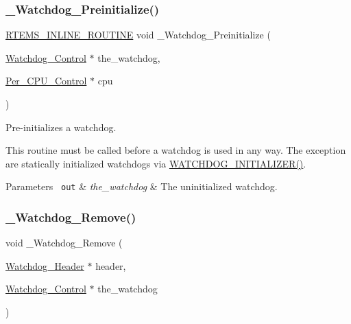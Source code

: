 \subsubsection{\texorpdfstring{\_Watchdog\_Preinitialize()}{\_Watchdog\_Preinitialize()}}
{\footnotesize\ttfamily \mbox{\hyperlink{group__RTEMSScoreBaseDefs_gac216239df231d5dbd15e3520b0b9313f}{R\+T\+E\+M\+S\+\_\+\+I\+N\+L\+I\+N\+E\+\_\+\+R\+O\+U\+T\+I\+NE}} void \+\_\+\+Watchdog\+\_\+\+Preinitialize (\begin{DoxyParamCaption}\item[{\mbox{\hyperlink{structWatchdog__Control}{Watchdog\+\_\+\+Control}} $\ast$}]{the\+\_\+watchdog,  }\item[{\mbox{\hyperlink{structPer__CPU__Control}{Per\+\_\+\+C\+P\+U\+\_\+\+Control}} $\ast$}]{cpu }\end{DoxyParamCaption})}



Pre-\/initializes a watchdog. 

This routine must be called before a watchdog is used in any way. The exception are statically initialized watchdogs via \mbox{\hyperlink{group__RTEMSScoreWatchdog_gad9a70c605b99f006aa7f5cbaf84fb05c}{W\+A\+T\+C\+H\+D\+O\+G\+\_\+\+I\+N\+I\+T\+I\+A\+L\+I\+Z\+E\+R()}}.


\begin{DoxyParams}[1]{Parameters}
\mbox{\texttt{ out}}  & {\em the\+\_\+watchdog} & The uninitialized watchdog. \\
\hline
\end{DoxyParams}
\mbox{\label{group__RTEMSScoreWatchdog_ga4c6dafd66518b5af7edb7c0d67572065}} 
\subsubsection{\texorpdfstring{\_Watchdog\_Remove()}{\_Watchdog\_Remove()}}
{\footnotesize\ttfamily void \+\_\+\+Watchdog\+\_\+\+Remove (\begin{DoxyParamCaption}\item[{\mbox{\hyperlink{structWatchdog__Header}{Watchdog\+\_\+\+Header}} $\ast$}]{header,  }\item[{\mbox{\hyperlink{structWatchdog__Control}{Watchdog\+\_\+\+Control}} $\ast$}]{the\+\_\+watchdog }\end{DoxyParamCaption})}



